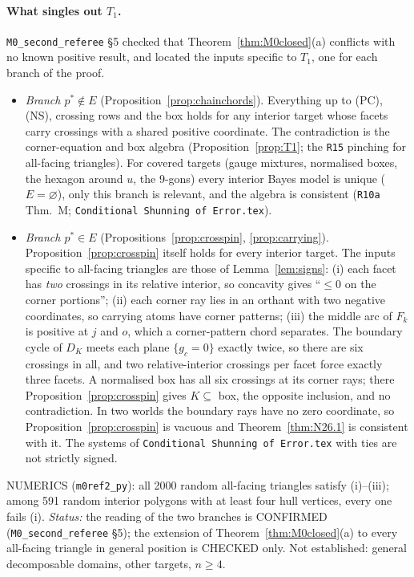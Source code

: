 \documentclass[11pt]{article}
\theoremstyle{definition}
\theoremstyle{remark}
\newcommand{\src}[1]{\texttt{#1}}
\begin{document}
\paragraph{What singles out $T_1$.} \src{M0\_second\_referee} \S5 checked that Theorem~\ref{thm:M0closed}(a) conflicts with no known positive result, and located the inputs specific to $T_1$, one for each branch of the proof.
\begin{itemize}[leftmargin=*]
\item \emph{Branch $p^*\notin E$} (Proposition~\ref{prop:chainchords}). Everything up to (PC), (NS), crossing rows and the box holds for any interior target whose facets carry crossings with a shared positive coordinate. The contradiction is the corner-equation and box algebra (Proposition~\ref{prop:T1}; the \src{R15} pinching for all-facing triangles). For covered targets (gauge mixtures, normalised boxes, the hexagon around $u$, the 9-gons) every interior Bayes model is unique ($E=\varnothing$), only this branch is relevant, and the algebra is consistent (\src{R10a} Thm.~M; \src{Conditional Shunning of Error.tex}).
\item \emph{Branch $p^*\in E$} (Propositions~\ref{prop:crosspin}, \ref{prop:carrying}). Proposition~\ref{prop:crosspin} itself holds for every interior target. The inputs specific to all-facing triangles are those of Lemma~\ref{lem:signs}: (i) each facet has \emph{two} crossings in its relative interior, so concavity gives ``$\le0$ on the corner portions''; (ii) each corner ray lies in an orthant with two negative coordinates, so carrying atoms have corner patterns; (iii) the middle arc of $F_k$ is positive at $j$ and $o$, which a corner-pattern chord separates. The boundary cycle of $D_K$ meets each plane $\{g_c=0\}$ exactly twice, so there are six crossings in all, and two relative-interior crossings per facet force exactly three facets. A normalised box has all six crossings at its corner rays; there Proposition~\ref{prop:crosspin} gives $K\subseteq$ box, the opposite inclusion, and no contradiction. In two worlds the boundary rays have no zero coordinate, so Proposition~\ref{prop:crosspin} is vacuous and Theorem~\ref{thm:N26.1} is consistent with it. The systems of \src{Conditional Shunning of Error.tex} with ties are not strictly signed.
\end{itemize}
NUMERICS (\src{m0ref2\_py}): all 2000 random all-facing triangles satisfy (i)--(iii); among 591 random interior polygons with at least four hull vertices, every one fails (i). \emph{Status:} the reading of the two branches is CONFIRMED (\src{M0\_second\_referee} \S5); the extension of Theorem~\ref{thm:M0closed}(a) to every all-facing triangle in general position is CHECKED only. Not established: general decomposable domains, other targets, $n\ge4$.
\end{document}
